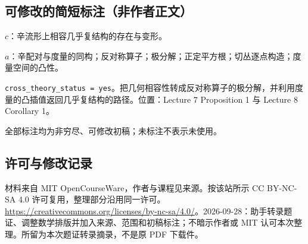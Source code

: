 \documentclass[UTF8,11pt]{ctexart}
\theoremstyle{definition}
\begin{document}
\subsection*{可修改的简短标注（非作者正文）}
$c$：辛流形上相容几乎复结构的存在与变形。

$a$：辛配对与度量的同构；反对称算子；极分解；正定平方根；切丛逐点构造；度量空间的凸性。

\texttt{cross\_theory\_status = yes}。把几何相容性转成反对称算子的极分解，并利用度量的凸插值返回几乎复结构的路径。位置：Lecture 7 Proposition 1 与 Lecture 8 Corollary 1。

全部标注均为非穷尽、可修改初稿；未标注不表示未使用。
\subsection*{许可与修改记录}
材料来自 MIT OpenCourseWare，作者与课程见来源。按该站所示 CC BY-NC-SA 4.0 许可复用，整理部分沿用同一许可。\url{https://creativecommons.org/licenses/by-nc-sa/4.0/}。2026-09-28：助手转录题证、调整数学排版并加入来源、范围和初稿标注；不暗示作者或 MIT 认可本次整理。所留为本次题证转录摘录，不是原 PDF 下载件。
\end{document}
